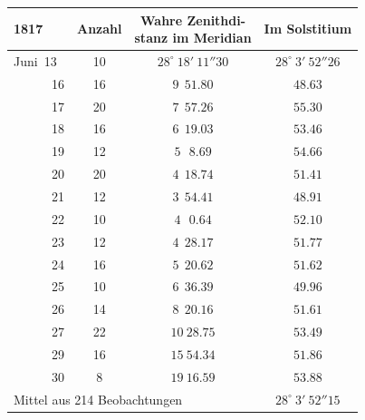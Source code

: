 \begin{center}\fontsize{10}{12}\selectfont\setlength{\tabcolsep}{3pt}
\begin{tabular}{l|c|c|c}
1817 & Anzahl & \shortstack{Wahre Zenithdi-\\stanz im Meridian} & Im Solstitium \\
\hline
Juni\ 13 & 10 & $28^\circ\ 18'\ 11''30$ & $28^\circ\ 3'\ 52''26$ \\
\ \ \ \ \ \ 16 & 16 & $9\ \ 51.80$ & $48.63$ \\
\ \ \ \ \ \ 17 & 20 & $7\ \ 57.26$ & $55.30$ \\
\ \ \ \ \ \ 18 & 16 & $6\ \ 19.03$ & $53.46$ \\
\ \ \ \ \ \ 19 & 12 & $5\ \ \ 8.69$ & $54.66$ \\
\ \ \ \ \ \ 20 & 20 & $4\ \ 18.74$ & $51.41$ \\
\ \ \ \ \ \ 21 & 12 & $3\ \ 54.41$ & $48.91$ \\
\ \ \ \ \ \ 22 & 10 & $4\ \ \ 0.64$ & $52.10$ \\
\ \ \ \ \ \ 23 & 12 & $4\ \ 28.17$ & $51.77$ \\
\ \ \ \ \ \ 24 & 16 & $5\ \ 20.62$ & $51.62$ \\
\ \ \ \ \ \ 25 & 10 & $6\ \ 36.39$ & $49.96$ \\
\ \ \ \ \ \ 26 & 14 & $8\ \ 20.16$ & $51.61$ \\
\ \ \ \ \ \ 27 & 22 & $10\ 28.75$ & $53.49$ \\
\ \ \ \ \ \ 29 & 16 & $15\ 54.34$ & $51.86$ \\
\ \ \ \ \ \ 30 & 8 & $19\ 16.59$ & $53.88$ \\
\multicolumn{3}{l}{Mittel aus 214 Beobachtungen} & $28^\circ\ 3'\ 52''15$ \\
\end{tabular}
\end{center}

